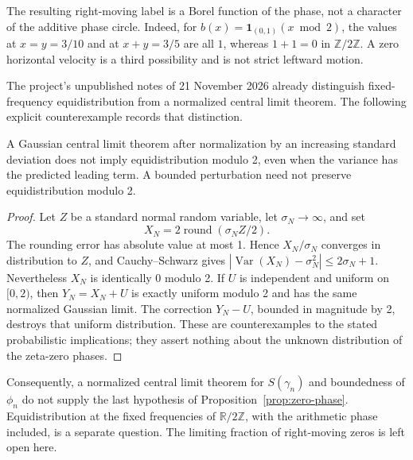 The resulting right-moving label is a Borel function of the phase, not a character of the additive phase circle. Indeed, for $b(x)=\mathbf1_{(0,1)}(x\bmod2)$, the values at $x=y=3/10$ and at $x+y=3/5$ are all $1$, whereas $1+1=0$ in $\mathbb Z/2\mathbb Z$. A zero horizontal velocity is a third possibility and is not strict leftward motion.

The project's unpublished notes of 21 November 2026 already distinguish fixed-frequency equidistribution from a normalized central limit theorem. The following explicit counterexample records that distinction.

\begin{proposition}\label{prop:clt-not-modulo}
A Gaussian central limit theorem after normalization by an increasing standard deviation does not imply equidistribution modulo 2, even when the variance has the predicted leading term. A bounded perturbation need not preserve equidistribution modulo 2.
\end{proposition}
\begin{proof}
Let $Z$ be a standard normal random variable, let $\sigma_N\to\infty$, and set
\[
 X_N=2\operatorname{round}(\sigma_NZ/2).
\]
The rounding error has absolute value at most 1. Hence $X_N/\sigma_N$ converges in distribution to $Z$, and Cauchy--Schwarz gives
$|\operatorname{Var}(X_N)-\sigma_N^2|\le2\sigma_N+1$.
Nevertheless $X_N$ is identically 0 modulo 2. If $U$ is independent and uniform on $[0,2)$, then $Y_N=X_N+U$ is exactly uniform modulo 2 and has the same normalized Gaussian limit. The correction $Y_N-U$, bounded in magnitude by 2, destroys that uniform distribution. These are counterexamples to the stated probabilistic implications; they assert nothing about the unknown distribution of the zeta-zero phases.
\end{proof}

Consequently, a normalized central limit theorem for $S(\gamma_n)$ and boundedness of $\phi_n$ do not supply the last hypothesis of Proposition~\ref{prop:zero-phase}. Equidistribution at the fixed frequencies of $\mathbb R/2\mathbb Z$, with the arithmetic phase included, is a separate question. The limiting fraction of right-moving zeros is left open here.
